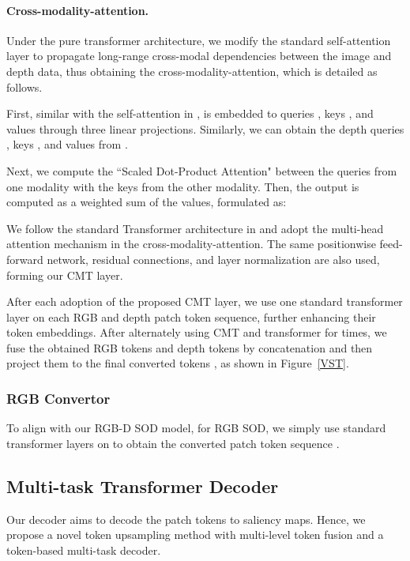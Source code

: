 \documentclass[10pt,twocolumn,letterpaper]{article}
\begin{document}
\vspace{-3mm}
\paragraph{Cross-modality-attention.}
Under the pure transformer architecture, we modify the standard self-attention layer to propagate long-range cross-modal dependencies between the image and depth data, thus obtaining the cross-modality-attention, which is detailed as follows.

First, similar with the self-attention in \cite{vaswani2017attention},  is embedded to queries , keys , and values  through three linear projections.
Similarly, we can obtain the depth queries , keys , and values  from .

Next, we compute the ``Scaled Dot-Product Attention" \cite{vaswani2017attention} between the queries from one modality with the keys from the other modality. Then, the output is computed as a weighted sum of the values, formulated as:


We follow the standard Transformer architecture in \cite{vaswani2017attention} and adopt the multi-head attention mechanism in the cross-modality-attention. The same positionwise feed-forward network, residual connections, and layer normalization \cite{ba2016layer} are also used, forming our CMT layer.

After each adoption of the proposed CMT layer, we use one standard transformer layer 
on each RGB and depth patch token sequence, further enhancing their token embeddings. After alternately using CMT and transformer for  times, we fuse the obtained RGB tokens and depth tokens by concatenation and then project them to the final converted tokens , as shown in Figure~\ref{VST}.

\vspace{-3mm}
\subsubsection{RGB Convertor}
To align with our RGB-D SOD model, for RGB SOD, we simply use  standard transformer layers on  to obtain the converted patch token sequence .

\subsection{Multi-task Transformer Decoder}
Our decoder aims to decode the patch tokens  to saliency maps. 
Hence,
we propose a novel token upsampling method with multi-level token fusion and a token-based multi-task decoder.
\end{document}
